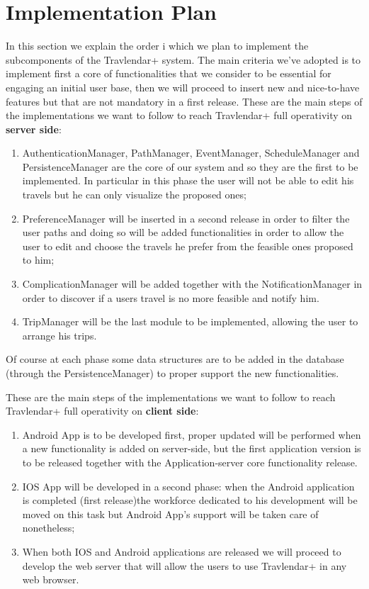 \section{Implementation Plan}
In this section we explain the order i which we plan to implement the subcomponents of the Travlendar+ system.
The main criteria we've adopted is to implement first a core of functionalities that we consider to be essential for engaging an initial user base, then we will proceed to insert new and nice-to-have features but that are not mandatory in a first release.
These are the main steps of the implementations we want to follow to reach Travlendar+ full operativity on \textbf{server side}:
\begin{enumerate}
\item AuthenticationManager, PathManager, EventManager, ScheduleManager and PersistenceManager are the core of our system and so they are the first to be implemented. In particular in this phase the user will not be able to edit his travels but he can only visualize the proposed ones;
\item PreferenceManager will be inserted in a second release in order to filter the user paths and doing so will be added functionalities in order to allow the user to edit and choose the travels he prefer from the feasible ones proposed to him;
\item ComplicationManager will be added together with the NotificationManager in order to discover if a users travel is no more feasible and notify him.
\item TripManager will be the last module to be implemented, allowing the user to arrange his trips.
\end{enumerate}
Of course at each phase some data structures are to be added in the database (through the PersistenceManager) to proper support the new functionalities.

These are the main steps of the implementations we want to follow to reach Travlendar+ full operativity on \textbf{client side}:
\begin{enumerate}
\item Android App is to be developed first, proper updated will be performed when a new functionality is added on server-side, but the first application version is to be released together with the Application-server core functionality release.
\item IOS App will be developed in a second phase: when the Android application is completed (first release)the workforce dedicated to his development will be moved on this task but Android App's support will be taken care of nonetheless;
\item When both IOS and Android applications are released we will proceed to develop the web server that will allow the users to use Travlendar+ in any web browser.
\end{enumerate}

